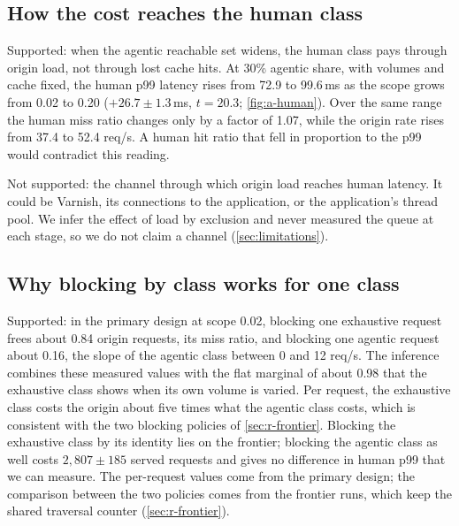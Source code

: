 \subsection{How the cost reaches the human class}\label{sec:m-human}
Supported: when the agentic reachable set widens, the human class pays through origin load,
not through lost cache hits.
At 30\% agentic share, with volumes and cache fixed, the human p99 latency rises from
72.9 to 99.6\,ms as the scope grows from 0.02 to 0.20 ($+26.7 \pm 1.3$\,ms,
$t = 20.3$; \cref{fig:a-human}).
Over the same range the human miss ratio changes only by a factor of 1.07, while the
origin rate rises from 37.4 to 52.4 req/s.
A human hit ratio that fell in proportion to the p99 would contradict this
reading.

Not supported: the channel through which origin load reaches human latency.
It could be Varnish, its connections to the application, or the application's thread
pool.
We infer the effect of load by exclusion and never measured the queue at each stage, so
we do not claim a channel (\cref{sec:limitations}).

\subsection{Why blocking by class works for one class}\label{sec:m-block}
Supported: in the primary design at scope 0.02, blocking one exhaustive request frees about
0.84 origin requests, its miss ratio, and blocking one agentic request about 0.16, the slope
of the agentic class between 0 and 12 req/s.
The inference combines these measured values with the flat marginal of about 0.98 that the
exhaustive class shows when its own volume is varied.
Per request, the exhaustive class costs the origin about five times what the agentic class
costs, which is consistent with the two blocking policies of
\cref{sec:r-frontier}.
Blocking the exhaustive class by its identity lies on the frontier; blocking the agentic class
as well costs $2{,}807 \pm 185$ served requests and gives no difference in human p99 that we
can measure.
The per-request values come from the primary design; the comparison between the two
policies comes from the frontier runs, which keep the shared traversal counter
(\cref{sec:r-frontier}).

